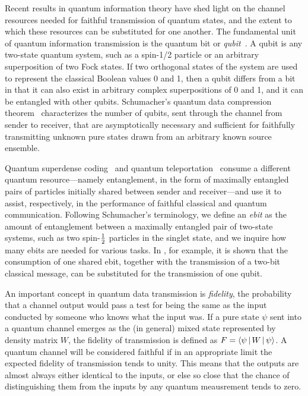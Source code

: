 Recent results in quantum information theory have shed light on
the channel resources needed for faithful transmission of
quantum states, and the extent to which these resources can be
substituted for one another.
The fundamental unit of quantum information transmission is
the quantum bit or {\em qubit\/}~\cite{Schu95}.
A qubit is any two-state
quantum system, such as a spin-1/2 particle or an arbitrary superposition of
two Fock states.  If two orthogonal states of the system are used to represent
the classical Boolean values 0 and 1, then a qubit differs from a bit in that it
can also exist in arbitrary complex superpositions of 0 and 1, and it can be
entangled with other qubits.  Schumacher's quantum data compression
theorem~\cite{Schu95,JS94} characterizes the number of
qubits, sent through the channel from sender to
receiver, that are asymptotically necessary and
sufficient for faithfully transmitting unknown pure states
drawn from an arbitrary known source ensemble.

Quantum superdense coding~\cite{BW92} and
quantum teleportation~\cite{BBCJPW93} consume a different quantum
resource---namely entanglement, in the form of maximally
entangled pairs of particles initially shared between sender and
receiver---and use it to assist, respectively, in the performance
of faithful classical and quantum communication.  Following
Schumacher's terminology, we define an {\em ebit\/} as the amount
of entanglement between a maximally entangled pair of two-state
systems, such as two spin-$\mbox{$\textstyle \frac{1}{2}$}$ particles in the singlet state,
and we inquire how many ebits are needed for various tasks.
In \cite{BBCJPW93}, for example, it is shown that the consumption
of one shared ebit, together with the transmission of a two-bit
classical message, can be substituted for the transmission of one
qubit.
 
An important concept in quantum data transmission is {\sl fidelity\/},
the probability that a channel output would pass a test for being the
same as the input conducted by someone who knows what the input was.
If a pure state $\psi$ sent into a quantum channel emerges as the
(in general) mixed state represented by density matrix $W$, the fidelity
of transmission is defined
as $F=\left \langle \psi \, \right |W\left | \, \psi \right \rangle$.  A quantum channel will be
considered faithful if in an appropriate limit the expected fidelity
of transmission tends to unity.  This means that the outputs are almost
always either identical to the inputs, or else so close that the
chance of distinguishing them from the inputs by any quantum meausrement
tends to zero.
 
